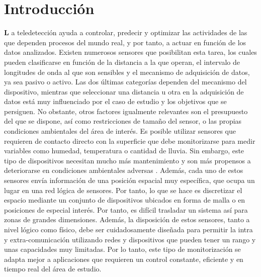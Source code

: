 \setchapterpreamble[u]{\margintoc}
\chapter*{Introducción}
\label{sec:introduction_spanish}

\lettrine[findent=0pt, lines=3]{\textbf{L}}{ }a teledetección ayuda a controlar, predecir y optimizar las actividades de las que dependen procesos del mundo real, y por tanto, a actuar en función de los datos analizados. Existen numerosos sensores que posibilitan esta tarea, los cuales pueden clasificarse en función de la distancia a la que operan, el intervalo de longitudes de onda al que son sensibles y el mecanismo de adquisición de datos, ya sea pasivo o activo. Las dos últimas categorías dependen del mecanismo del dispositivo, mientras que seleccionar una distancia u otra en la adquisición de datos está muy influenciado por el caso de estudio y los objetivos que se persiguen. No obstante, otros factores igualmente relevantes son el presupuesto del que se dispone, así como restricciones de tamaño del sensor, o las propias condiciones ambientales del área de interés. Es posible utilizar sensores que requieren de contacto directo con la superficie que debe monitorizarse para medir variables como humedad, temperatura o cantidad de lluvia. Sin embargo, este tipo de dispositivos necesitan mucho más mantenimiento y son más propensos a deteriorarse en condiciones ambientales adversas \cite{silva_low-cost_2019, morais_versatile_2021}. Además, cada uno de estos sensores envía información de una posición espacial muy específica, que ocupa un lugar en una red lógica de sensores. Por tanto, lo que se hace es discretizar el espacio mediante un conjunto de dispositivos ubicados en forma de malla o en posiciones de especial interés. Por tanto, es difícil trasladar un sistema así para zonas de grandes dimensiones. Además, la disposición de estos sensores, tanto a nivel lógico como físico, debe ser cuidadosamente diseñada para permitir la intra y extra-comunicación utilizando redes y dispositivos que pueden tener un rango y unas capacidades muy limitadas. Por lo tanto, este tipo de monitorización se adapta mejor a aplicaciones que requieren un control constante, eficiente y en tiempo real del área de estudio. 

